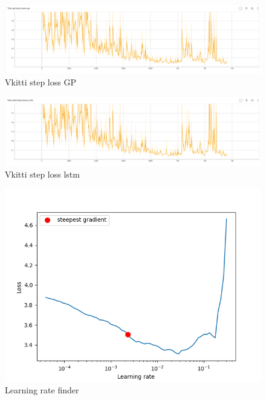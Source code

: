 	\begin{figure}
		\centering
		\includegraphics[width=13cm]{images/gp_step_loss_vkitti.png}
		\caption{Vkitti step loss GP}
		\label{fig:android_result}
	\end{figure}

	\begin{figure}
		\centering
		\includegraphics[width=13cm]{images/lstm_step_loss_vkitti.png}
		\caption{Vkitti step loss lstm}
		\label{fig:android_result}
	\end{figure}

	\begin{figure}
		\centering
		\includegraphics[width=13cm]{images/lr_finder_41.png}
		\caption{Learning rate finder}
		\label{fig:android_result}
	\end{figure}



